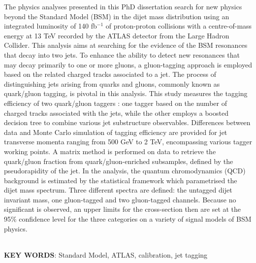 \documentclass[UTF8,12pt]{ctexart}
\numberwithin{equation}{section}
\def\vs{\vspace*{1mm}}
\def\ifb{fb$^{-1}$ }
\begin{document}
The physics analyses presented in this PhD dissertation search for new physics beyond the Standard Model (BSM) in the dijet mass distribution using an integrated luminosity of 140 \ifb of proton-proton collisions with a centre-of-mass energy at 13 TeV recorded by the ATLAS detector from the Large Hadron Collider. This analysis aims at searching for the evidence of the BSM resonances that decay into two jets. To enhance the ability to detect new resonances that may decay primarily to one or more gluons, a gluon-tagging approach is employed based on the related charged tracks associated to a jet. 
The process of distinguishing jets arising from quarks and gluons, commonly known as quark/gluon tagging, is pivotal in this analysis. This study measures the tagging efficiency of two quark/gluon taggers : one tagger based on the number of charged tracks associated with the jets, while the other employs a boosted decision tree to combine various jet substructure observables. Differences between data and Monte Carlo simulation of tagging efficiency are provided for jet transverse momenta ranging from 500 GeV to 2 TeV, encompassing various tagger working points. A matrix method is performed on data to retrieve the quark/gluon fraction from quark/gluon-enriched subsamples, defined by the pseudorapidity of the jet. In the analysis, the quantum chromodynamics (QCD) background is estimated by the statistical framework which parametrised the dijet mass spectrum. Three different spectra are defined: the untagged dijet invariant mass, one gluon-tagged and two gluon-tagged channels. Because no significant is observed, an upper limits for the cross-section then are set at the 95\% confidence level for the three categories on a variety of signal models of BSM physics.





~\\ 
\textbf{KEY WORDS}: 
Standard Model, ATLAS, calibration, jet tagging


\newpage 


\end{document}
